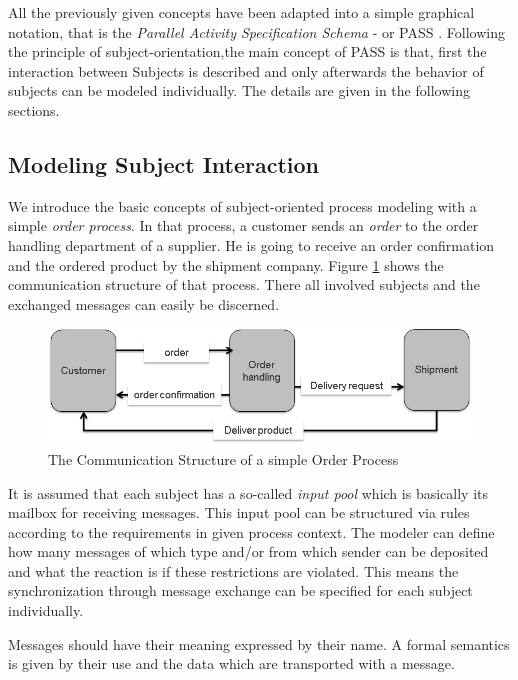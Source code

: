 All the previously given concepts have been adapted into a simple graphical notation, that is the \textit{Parallel Activity Specification Schema} - or PASS . Following the principle of subject-orientation,the main concept of PASS is that, first the interaction between Subjects is described and only afterwards the behavior of subjects can be modeled individually. The details are given in the following sections.

\subsection{Modeling Subject Interaction}

We introduce the basic concepts of subject-oriented process modeling with a simple  \textit{order process}. In that process, a customer sends an \textit{order} to the order handling department of a supplier. He is going to receive an order confirmation and the ordered product by the shipment company. Figure \ref{fig:ordercomstructure1} shows the communication structure of that process. There all involved subjects and the exchanged messages can easily be discerned. 

\begin{figure}[htbp]
	\centering
	\includegraphics[width=0.7\linewidth]{Figures/Ontology/SubjectBehavior/OrderComStructure}
	\caption[The Communication Structure of a simple Order Process]{The Communication Structure of a simple Order Process}
	\label{fig:ordercomstructure1}
\end{figure}

It is assumed that  each subject has a so-called \textit{input pool} which is basically its mailbox for receiving messages. This input pool can be structured via rules according to the requirements in given process context. The modeler can define how many messages of which type and/or from which sender can be deposited and what the reaction is if these restrictions are violated. This means the synchronization through message exchange can be specified for each subject individually.

Messages should have their meaning expressed by their name. A formal semantics is given by their use and the data which are transported with a message. 


